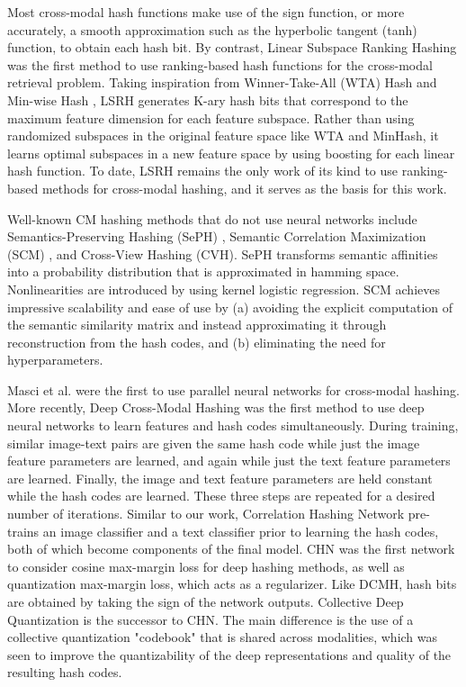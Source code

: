 \documentclass[letterpaper]{article}
\begin{document}
Most cross-modal hash functions make use of the sign function, or more accurately, a smooth approximation such as the hyperbolic tangent (tanh) function, to obtain each hash bit. By contrast, Linear Subspace Ranking Hashing \cite{kai} was the first method to use ranking-based hash functions for the cross-modal retrieval problem. Taking inspiration from Winner-Take-All (WTA) Hash \cite{wta} and Min-wise Hash \cite{minhash}, LSRH generates K-ary hash bits that correspond to the maximum feature dimension for each feature subspace. Rather than using randomized subspaces in the original feature space like WTA and MinHash, it learns optimal subspaces in a new feature space by using boosting for each linear hash function. To date, LSRH remains the only work of its kind to use ranking-based methods for cross-modal hashing, and it serves as the basis for this work.

Well-known CM hashing methods that do not use neural networks include Semantics-Preserving Hashing (SePH) \cite{seph}, Semantic Correlation Maximization (SCM) \cite{scm}, and Cross-View Hashing (CVH). SePH transforms semantic affinities into a probability distribution that is approximated in hamming space. Nonlinearities are introduced by using kernel logistic regression. SCM achieves impressive scalability and ease of use by (a) avoiding the explicit computation of the semantic similarity matrix and instead approximating it through reconstruction from the hash codes, and (b) eliminating the need for hyperparameters.

Masci et al. \cite{masci} were the first to use parallel neural networks for cross-modal hashing. More recently, Deep Cross-Modal Hashing \cite{dcmh} was the first method to use deep neural networks to learn features and hash codes simultaneously. During training, similar image-text pairs are given the same hash code while just the image feature parameters are learned, and again while just the text feature parameters are learned. Finally, the image and text feature parameters are held constant while the hash codes are learned. These three steps are repeated for a desired number of iterations. Similar to our work, Correlation Hashing Network \cite{chn} pre-trains an image classifier and a text classifier prior to learning the hash codes, both of which become components of the final model. CHN was the first network to consider cosine max-margin loss for deep hashing methods, as well as quantization max-margin loss, which acts as a regularizer. Like DCMH, hash bits are obtained by taking the sign of the network outputs. Collective Deep Quantization \cite {cdq} is the successor to CHN. The main difference is the use of a collective quantization "codebook" that is shared across modalities, which was seen to improve the quantizability of the deep representations and quality of the resulting hash codes.
\end{document}
